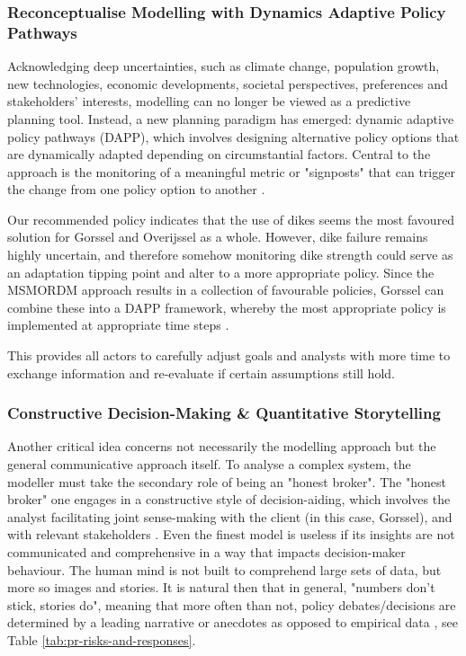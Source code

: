 \subsubsection{Reconceptualise Modelling with Dynamics Adaptive Policy Pathways}

Acknowledging deep uncertainties, such as climate change, population growth, new technologies, economic developments, societal perspectives, preferences and stakeholders' interests, modelling can no longer be viewed as a predictive planning tool. Instead, a new planning paradigm has emerged: dynamic adaptive policy pathways (DAPP), which involves designing alternative policy options that are dynamically adapted depending on circumstantial factors. Central to the approach is the monitoring of a meaningful metric or "signposts" that can trigger the change from one policy option to another \parencite{haasnoot_dynamic_2013}.

Our recommended policy indicates that the use of dikes seems the most favoured solution for Gorssel and Overijssel as a whole. However, dike failure remains highly uncertain, and therefore somehow monitoring dike strength could serve as an adaptation tipping point and alter to a more appropriate policy. Since the MSMORDM approach results in a collection of favourable policies, Gorssel can combine these into a DAPP framework, whereby the most appropriate policy is implemented at appropriate time steps \parencite{kwakkel_developing_2015}. 

This provides all actors to carefully adjust goals and analysts with more time to exchange information and re-evaluate if certain assumptions still hold. 

\subsubsection{Constructive Decision-Making \& Quantitative Storytelling}

Another critical idea concerns not necessarily the modelling approach but the general communicative approach itself. To analyse a complex system, the modeller must take the secondary role of being an "honest broker". The "honest broker" one engages in a constructive style of decision-aiding, which involves the analyst facilitating joint sense-making with the client (in this case, Gorssel), and with relevant stakeholders \parencite{tsoukias_decision_2008}. Even the finest model is useless if its insights are not communicated and comprehensive in a way that impacts decision-maker behaviour. The human mind is not built to comprehend large sets of data, but more so images and stories. It is natural then that in general, "numbers don't stick, stories do", meaning that more often than not, policy debates/decisions are determined by a leading narrative or anecdotes as opposed to empirical data \parencite{kettl_making_2016}, see Table \ref{tab:pr-risks-and-responses}. 




